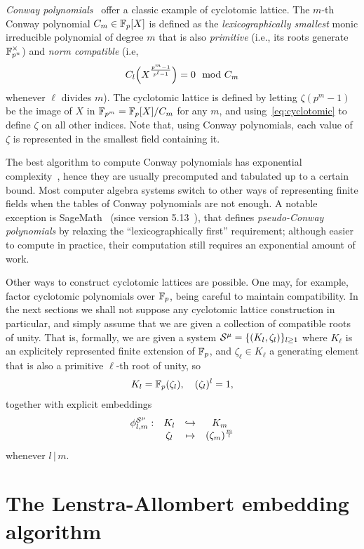 \documentclass{sig-alternate}
\begin{document}
\emph{Conway polynomials}~\cite{Nickel1988} offer a classic example of
cyclotomic lattice. %
The $m$-th Conway polynomial $C_m\in\F_p[X]$ is defined as the
\emph{lexicographically smallest} monic irreducible polynomial of
degree $m$ that is also \emph{primitive} (i.e., its roots generate
$\F_{p^n}^\times$) and \emph{norm compatible} (i.e,
$$C_\ell\Bigl(X^{\frac{p^m-1}{p^\ell-1}}\Bigr) = 0 \mod C_m$$
whenever $\ell$ divides $m$). %
The cyclotomic lattice is defined by letting $\zeta(p^m-1)$ be the
image of $X$ in $\F_{p^m}=\F_p[X]/C_m$ for any $m$, and
using~\eqref{eq:cyclotomic} to define $\zeta$ on all other indices. %
Note that, using Conway polynomials, each value of $\zeta$ is
represented in the smallest field containing it.

The best algorithm to compute Conway polynomials has exponential
complexity~\cite{heath+loehr99}, hence they are usually precomputed
and tabulated up to a certain bound. %
Most computer algebra systems switch to other ways of representing
finite fields when the tables of Conway polynomials are not enough. %
A notable exception is SageMath~\cite{Sage} (since version
5.13~\cite{Roe2013}), that defines \emph{pseudo-Conway polynomials} by
relaxing the ``lexicographically first'' requirement; although
easier to compute in practice, their computation still requires an
exponential amount of work.

Other ways to construct cyclotomic lattices are possible. %
One may, for example, factor cyclotomic polynomials over $\F_p$, being
careful to maintain compatibility. %
In the next sections we shall not suppose any cyclotomic lattice
construction in particular, and simply assume that we are given a
collection of compatible roots of unity.
That is, formally, we are given a system $\system=\{(K_\ell,\zeta_\ell)\}_{\ell\geq1}$
where $K_\ell$ is an explicitely represented finite extension of $\F_p$,
and $\zeta_\ell\in K_\ell$ a generating element that is also a primitive $\ell$-th root
of unity,
so \[ K_\ell=\F_p(\zeta_\ell),\quad(\zeta_\ell)^\ell=1, \]
together with
explicit embeddings
\[
\begin{array}{cccc}
  \embedcyc{\ell}{m}: & K_\ell & \hookrightarrow & K_m \\
  & \zeta_\ell & \mapsto & (\zeta_{m})^{\frac{m}{\ell}}
\end{array}
\]
whenever $l\,|\,m$.

\section{The Lenstra-Allombert embedding algorithm}
\label{sec:lenstra}
\end{document}
